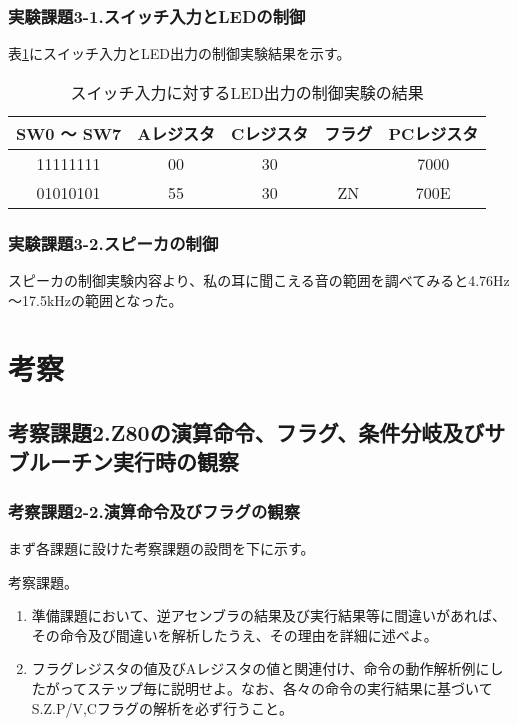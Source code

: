 \documentclass[11pt,a4j]{jsarticle}
\begin{document}
   \subsubsection{実験課題3-1.スイッチ入力とLEDの制御}
   
   表\ref{tab:kekka3-1}にスイッチ入力とLED出力の制御実験結果を示す。
   
   \begin{table}[htb]
  \begin{center}
    \caption{スイッチ入力に対するLED出力の制御実験の結果}
    \begin{tabular}{|c|c|c|c|c|} \hline
SW0 ～ SW7 & Aレジスタ & Cレジスタ & フラグ & PCレジスタ \\ \hline
11111111 & 00 & 30 &  & 7000 \\ \hline
01010101 & 55 & 30 & ZN & 700E \\ \hline
    \end{tabular}
    \label{tab:kekka3-1}
  \end{center}
 \end{table}
   
   \subsubsection{実験課題3-2.スピーカの制御}
   
   スピーカの制御実験内容より、私の耳に聞こえる音の範囲を調べてみると4.76Hz～17.5kHzの範囲となった。
   
  
  
 \section{考察}
  
  \subsection{考察課題2.Z80の演算命令、フラグ、条件分岐及びサブルーチン実行時の観察}
   \subsubsection{考察課題2-2.演算命令及びフラグの観察}
   
   まず各課題に設けた考察課題の設問を下に示す。
   
   考察課題。
   \begin{enumerate}
   \item 準備課題において、逆アセンブラの結果及び実行結果等に間違いがあれば、その命令及び間違いを解析したうえ、その理由を詳細に述べよ。
   \item フラグレジスタの値及びAレジスタの値と関連付け、命令の動作解析例にしたがってステップ毎に説明せよ。なお、各々の命令の実行結果に基づいてS.Z.P/V,Cフラグの解析を必ず行うこと。
   \end{enumerate}
   
\end{document}

